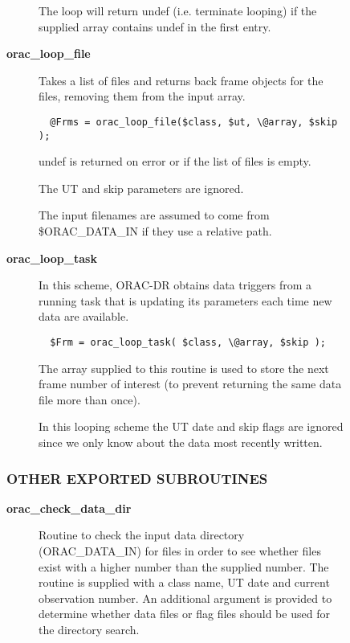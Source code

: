 \begin{description}
\begin{description}
\begin{description}
The loop will return undef (i.e. terminate looping) if the
supplied array contains undef in the first entry.


\item[{\textbf{orac\_loop\_file}}] \mbox{}

Takes a list of files and returns back frame objects for the files,
removing them from the input array.

\begin{verbatim}
  @Frms = orac_loop_file($class, $ut, \@array, $skip );
\end{verbatim}


undef is returned on error or if the list of files is empty.



The UT and skip parameters are ignored.



The input filenames are assumed to come from \$ORAC\_DATA\_IN if they use
a relative path.


\item[{\textbf{orac\_loop\_task}}] \mbox{}

In this scheme, ORAC-DR obtains data triggers from a running task
that is updating its parameters each time new data are available.

\begin{verbatim}
  $Frm = orac_loop_task( $class, \@array, $skip );
\end{verbatim}


The array supplied to this routine is used to store the next frame
number of interest (to prevent returning the same data file more than once).



In this looping scheme the UT date and skip flags are ignored since we
only know about the data most recently written.

\end{description}
\subsubsection*{OTHER EXPORTED SUBROUTINES\label{ORAC::Loop_OTHER_EXPORTED_SUBROUTINES}}
\begin{description}

\item[{\textbf{orac\_check\_data\_dir}}] \mbox{}

Routine to check the input data directory (ORAC\_DATA\_IN) for
files in order to see whether files exist with a higher number
than the supplied number. The routine is supplied with a class name,
UT date and current observation number. An additional argument
is provided to determine whether data files or flag files should
be used for the directory search.


\end{description}
\end{description}
\end{description}
